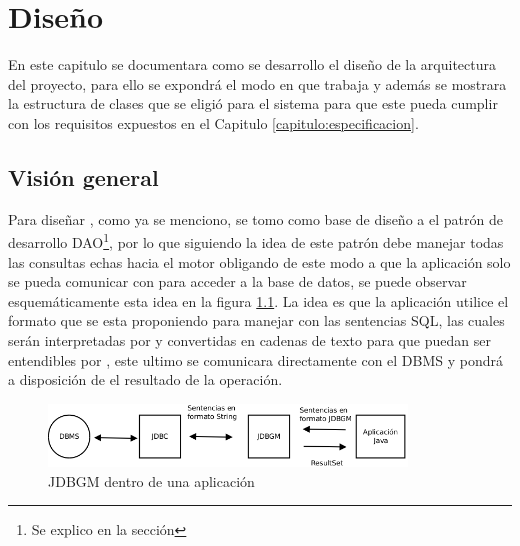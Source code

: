 \chapter{Diseño}\label{cap:disenio}

En este capitulo se documentara como se desarrollo el diseño de la arquitectura del proyecto, para ello se expondrá el modo en que trabaja \jd y además se mostrara la estructura de clases que se eligió para el sistema para que este pueda cumplir con los requisitos expuestos en el Capitulo \ref{capitulo:especificacion}.
%
%
%
\section{Visión general}
Para diseñar \jj, como ya se menciono, se tomo como base de diseño a el patrón de desarrollo DAO\footnote{Se explico en la sección }, por lo que siguiendo la idea de este patrón \jj debe manejar todas las consultas echas hacia el motor obligando de este modo a que la aplicación solo se pueda comunicar con \jj para acceder a la base de datos, se puede observar esquemáticamente esta idea en la figura \ref{fig:jdbgm:overview}. La idea es que la aplicación utilice el formato que se esta proponiendo para manejar con las sentencias SQL, las cuales serán interpretadas por \jj y convertidas en cadenas de texto para que puedan ser entendibles por \jd, este ultimo se comunicara directamente con el DBMS y pondrá a disposición de \jj el resultado de la operación. 
%
\begin{figure}[h]
  \centering
    \includegraphics[width=0.85\textwidth]{figuras/jdbgm-overview.png}
  \caption{JDBGM dentro de una aplicación}
  \label{fig:jdbgm:overview}
\end{figure}

